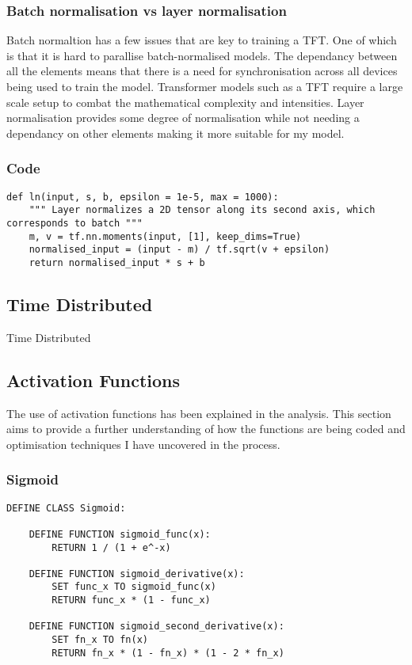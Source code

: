 \documentclass{article}
\begin{document}
\subsubsection{Batch normalisation vs layer normalisation}
Batch normaltion has a few issues that are key to training a TFT. One of which is that
it is hard to parallise batch-normalised models. The dependancy between all the elements
 means that there is a need for synchronisation across all devices being used to train the model. Transformer models such as a TFT require a large scale setup to combat the
 mathematical complexity and intensities. Layer normalisation provides some degree of
 normalisation while not needing a dependancy on other elements making it more suitable
 for my model.
\subsubsection{Code}
\begin{lstlisting}
def ln(input, s, b, epsilon = 1e-5, max = 1000):
    """ Layer normalizes a 2D tensor along its second axis, which corresponds to batch """
    m, v = tf.nn.moments(input, [1], keep_dims=True)
    normalised_input = (input - m) / tf.sqrt(v + epsilon)
    return normalised_input * s + b
\end{lstlisting}
\clearpage





\subsection{Time Distributed}
Time Distributed




\subsection{Activation Functions}
The use of activation functions has been explained in the analysis. This section
aims to provide a further understanding of how the functions are being coded and
optimisation techniques I have uncovered in the process.
\subsubsection{Sigmoid}
\begin{lstlisting}
DEFINE CLASS Sigmoid:

    DEFINE FUNCTION sigmoid_func(x):
        RETURN 1 / (1 + e^-x)

    DEFINE FUNCTION sigmoid_derivative(x):
        SET func_x TO sigmoid_func(x)
        RETURN func_x * (1 - func_x)

    DEFINE FUNCTION sigmoid_second_derivative(x):
        SET fn_x TO fn(x)
        RETURN fn_x * (1 - fn_x) * (1 - 2 * fn_x)
\end{lstlisting}
\end{document}
